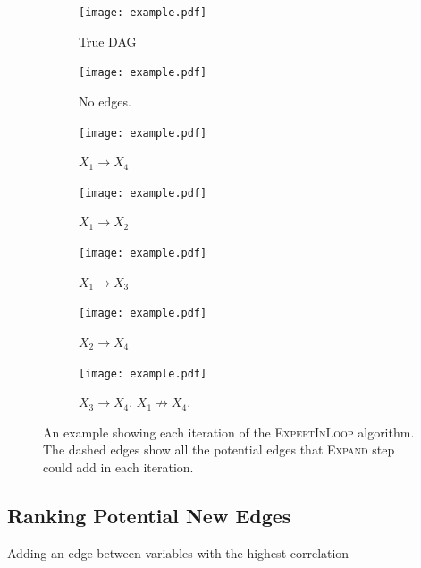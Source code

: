 \documentclass{uai2025} %
\begin{document}
\begin{figure}[t!]
	\begin{subfigure}{0.125 \textwidth}
		\centering
		\texttt{[image: example.pdf]}
		\caption{True DAG}
	\end{subfigure}%
	\begin{subfigure}{0.125 \textwidth}
		\centering
		\texttt{[image: example.pdf]}
		\caption{No edges.}
	\end{subfigure}%
	\begin{subfigure}{0.125 \textwidth}
		\centering
		\texttt{[image: example.pdf]}
		\caption{$ X_1 \rightarrow X_4 $}
	\end{subfigure}%
	\begin{subfigure}{0.125 \textwidth}
		\centering
		\texttt{[image: example.pdf]}
		\caption{$ X_1 \rightarrow X_2 $}
	\end{subfigure}
	\begin{subfigure}{0.125 \textwidth}
		\centering
		\texttt{[image: example.pdf]}
		\caption{$ X_1 \rightarrow X_3 $}
	\end{subfigure}%
	\begin{subfigure}{0.125 \textwidth}
		\centering
		\texttt{[image: example.pdf]}
		\caption{$ X_2 \rightarrow X_4 $}
	\end{subfigure}%
	\begin{subfigure}{0.250 \textwidth}
		\centering
		\texttt{[image: example.pdf]}
		\caption{$ X_3 \rightarrow X_4 $. $ X_1 \not \rightarrow X_4 $.}
	\end{subfigure}
	\caption{An example showing each iteration of the \textsc{ExpertInLoop} algorithm. The dashed edges show all the potential edges that \textsc{Expand} step could add in each iteration.}
\end{figure}


\subsection{Ranking Potential New Edges}
\label{sec:ranking}

\begin{algorithm}[h]
\DontPrintSemicolon
\SetAlgoLined
{}
\caption{Adding an edge between variables with the highest correlation}
\label{algo:ranked_expand}
\end{algorithm}
\end{document}

